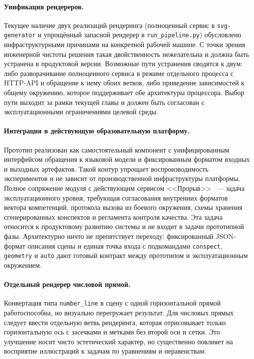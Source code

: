 \paragraph{Унификация рендереров.} Текущее наличие двух реализаций рендеринга (полноценный сервис в \texttt{svg-generator} и упрощённый запасной рендерер в \texttt{run\_pipeline.py}) обусловлено инфраструктурными причинами на конкретной рабочей машине. С точки зрения инженерной чистоты решения такая двойственность нежелательна и должна быть устранена в продуктовой версии. Возможные пути устранения сводятся к двум: либо разворачивание полноценного сервиса в режиме отдельного процесса с HTTP\nobreakdash-API и обращение к нему обоих ветков, либо приведение зависимостей к общему окружению, которое поддерживает обе архитектуры процессора. Выбор пути выходит за рамки текущей главы и должен быть согласован с эксплуатационными ограничениями целевой среды.

\paragraph{Интеграция в действующую образовательную платформу.} Прототип реализован как самостоятельный компонент с унифицированным интерфейсом обращения к языковой модели и фиксированным форматом входных и выходных артефактов. Такой контур упрощает воспроизводимость экспериментов и не зависит от производственной инфраструктуры платформы. Полное сопряжение модуля с действующим сервисом <<Прорыв>>~\cite{Proriv} --- задача эксплуатационного уровня, требующая согласования внутренних форматов вектора компетенций, протокола вызова из боевого окружения, схемы хранения сгенерированных конспектов и регламента контроля качества. Эта задача относится к продуктовому развитию системы и не входит в задачи прототипной фазы. Архитектурно ничто не препятствует переходу: фиксированный JSON\nobreakdash-формат описания сцены и единая точка входа  с подкомандами \texttt{conspect}, \texttt{geometry} и \texttt{auto} дают готовый контракт между прототипом и эксплуатационным окружением.

\paragraph{Отдельный рендерер числовой прямой.} Конвертация типа \texttt{number\_line} в сцену  с одной горизонтальной прямой работоспособна, но визуально перегружает результат. Для числовых прямых следует ввести отдельную ветвь рендеринга, которая отрисовывает только горизонтальную ось с засечками и метками без второй оси и сетки. Это улучшение носит чисто эстетический характер, но существенно повлияет на восприятие иллюстраций к задачам по уравнениям и неравенствам.

